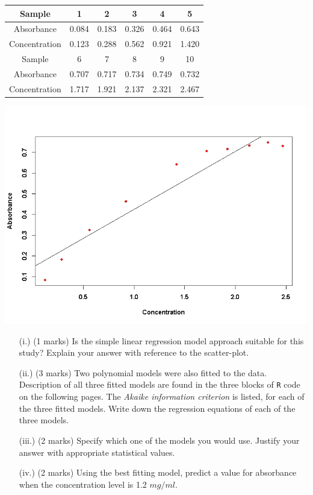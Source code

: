 \documentclass[a4paper,12pt]{article}
\begin{document}
\begin{center}
	\begin{tabular}{|c||c|c|c|c|c|}
		\hline
		Sample & 1 & 2 & 3 & 4 & 5 \\ \hline
		Absorbance & 0.084& 0.183& 0.326& 0.464& 0.643\\
		Concentration & 0.123& 0.288& 0.562& 0.921& 1.420\\ \hline
		Sample & 6 & 7 & 8 & 9 & 10 \\ \hline
		Absorbance & 0.707& 0.717& 0.734 &0.749 &0.732\\
		Concentration & 1.717& 1.921& 2.137 &2.321&2.467\\
		\hline
	\end{tabular}
\end{center}
\begin{center}
	\includegraphics[scale=0.45]{images/ExamQ3plot}
\end{center}
\begin{itemize}
	\item[(i.)] (1 marks) Is the simple linear regression model approach suitable for this study? Explain your answer with reference to the scatter-plot.
	\item[(ii.)] (3 marks) Two polynomial models were also fitted to the data. Description of all three fitted models are found in the three blocks of \texttt{R} code on the following pages. The \emph{Akaike information criterion} is listed, for each of the three fitted models. Write down the regression equations of each of the three models.
	\item[(iii.)] (2 marks) Specify which one of the models you would use. Justify your answer with appropriate statistical values.
	\item[(iv.)] (2 marks) Using the best fitting model, predict a value for absorbance when the concentration level is 1.2 $mg/ml$.
	
\end{itemize}
\end{document}
